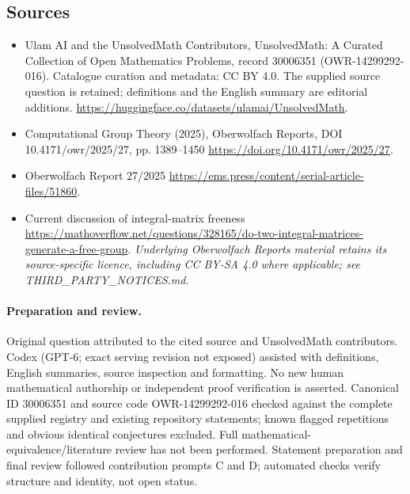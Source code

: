 \documentclass[11pt]{article}
\begin{document}
\subsection{Sources}
\begin{itemize}
\item[\hypertarget{source:30006351:1}{S1}] Ulam AI and the UnsolvedMath Contributors, UnsolvedMath: A Curated Collection of Open Mathematics Problems, record 30006351 (OWR-14299292-016). Catalogue curation and metadata: CC BY 4.0. The supplied source question is retained; definitions and the English summary are editorial additions.
\url{https://huggingface.co/datasets/ulamai/UnsolvedMath}.
\item[\hypertarget{source:30006351:2}{S2}] Computational Group Theory (2025), Oberwolfach Reports, DOI 10.4171/owr/2025/27, pp. 1389--1450
\url{https://doi.org/10.4171/owr/2025/27}.
\item[\hypertarget{source:30006351:3}{S3}] Oberwolfach Report 27/2025
\url{https://ems.press/content/serial-article-files/51860}.
\item[\hypertarget{source:30006351:4}{S4}] Current discussion of integral-matrix freeness
\url{https://mathoverflow.net/questions/328165/do-two-integral-matrices-generate-a-free-group}.
\textit{Underlying Oberwolfach Reports material retains its source-specific licence, including CC BY-SA 4.0 where applicable; see THIRD\_PARTY\_NOTICES.md.}
\end{itemize}
\paragraph{Preparation and review.}
Original question attributed to the cited source and UnsolvedMath contributors. Codex (GPT-6; exact serving revision not exposed) assisted with definitions, English summaries, source inspection and formatting. No new human mathematical authorship or independent proof verification is asserted. Canonical ID 30006351 and source code OWR-14299292-016 checked against the complete supplied registry and existing repository statements; known flagged repetitions and obvious identical conjectures excluded. Full mathematical-equivalence/literature review has not been performed. Statement preparation and final review followed contribution prompts C and D; automated checks verify structure and identity, not open status.
\label{end:30006351}
\end{document}
